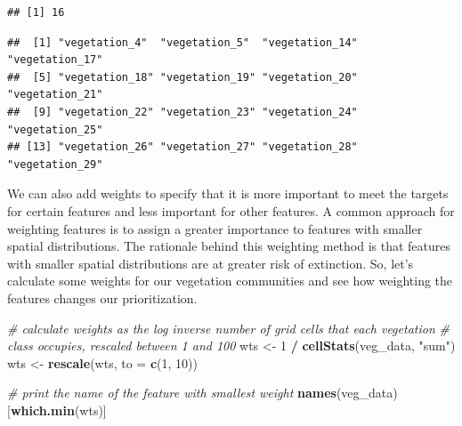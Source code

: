 \documentclass[12pt,]{book}
\newenvironment{Shaded}{\begin{snugshade}}{\end{snugshade}}
\newcommand{\CommentTok}[1]{\textcolor[rgb]{0.56,0.35,0.01}{\textit{#1}}}
\newcommand{\DataTypeTok}[1]{\textcolor[rgb]{0.13,0.29,0.53}{#1}}
\newcommand{\DecValTok}[1]{\textcolor[rgb]{0.00,0.00,0.81}{#1}}
\newcommand{\FloatTok}[1]{\textcolor[rgb]{0.00,0.00,0.81}{#1}}
\newcommand{\KeywordTok}[1]{\textcolor[rgb]{0.13,0.29,0.53}{\textbf{#1}}}
\newcommand{\NormalTok}[1]{#1}
\newcommand{\OperatorTok}[1]{\textcolor[rgb]{0.81,0.36,0.00}{\textbf{#1}}}
\newcommand{\StringTok}[1]{\textcolor[rgb]{0.31,0.60,0.02}{#1}}
\begin{document}
\begin{verbatim}
## [1] 16
\end{verbatim}

\begin{Shaded}
\end{Shaded}

\begin{verbatim}
##  [1] "vegetation_4"  "vegetation_5"  "vegetation_14" "vegetation_17"
##  [5] "vegetation_18" "vegetation_19" "vegetation_20" "vegetation_21"
##  [9] "vegetation_22" "vegetation_23" "vegetation_24" "vegetation_25"
## [13] "vegetation_26" "vegetation_27" "vegetation_28" "vegetation_29"
\end{verbatim}

We can also add weights to specify that it is more important to meet the targets for certain features and less important for other features. A common approach for weighting features is to assign a greater importance to features with smaller spatial distributions. The rationale behind this weighting method is that features with smaller spatial distributions are at greater risk of extinction. So, let's calculate some weights for our vegetation communities and see how weighting the features changes our prioritization.

\begin{Shaded}
\begin{Highlighting}[]
\CommentTok{# calculate weights as the log inverse number of grid cells that each vegetation}
\CommentTok{# class occupies, rescaled between 1 and 100}
\NormalTok{wts <-}\StringTok{ }\DecValTok{1} \OperatorTok{/}\StringTok{ }\KeywordTok{cellStats}\NormalTok{(veg_data, }\StringTok{"sum"}\NormalTok{)}
\NormalTok{wts <-}\StringTok{ }\KeywordTok{rescale}\NormalTok{(wts, }\DataTypeTok{to =} \KeywordTok{c}\NormalTok{(}\DecValTok{1}\NormalTok{, }\DecValTok{10}\NormalTok{))}

\CommentTok{# print the name of the feature with smallest weight}
\KeywordTok{names}\NormalTok{(veg_data)[}\KeywordTok{which.min}\NormalTok{(wts)]}
\end{Highlighting}
\end{Shaded}
\end{document}
